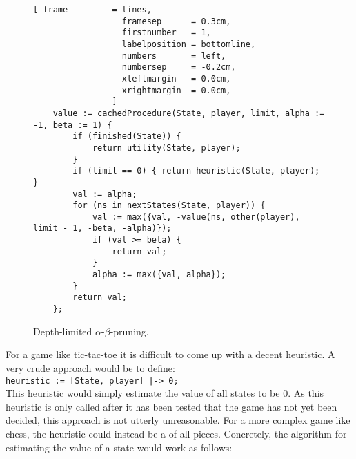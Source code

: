 \begin{figure}[!ht]
\centering
\begin{Verbatim}[ frame         = lines, 
                  framesep      = 0.3cm, 
                  firstnumber   = 1,
                  labelposition = bottomline,
                  numbers       = left,
                  numbersep     = -0.2cm,
                  xleftmargin   = 0.0cm,
                  xrightmargin  = 0.0cm,
                ]
    value := cachedProcedure(State, player, limit, alpha := -1, beta := 1) {
        if (finished(State)) {
            return utility(State, player);
        }
        if (limit == 0) { return heuristic(State, player); }  
        val := alpha;
        for (ns in nextStates(State, player)) {
            val := max({val, -value(ns, other(player), limit - 1, -beta, -alpha)});
            if (val >= beta) {
                return val;
            }
            alpha := max({val, alpha});
        }
        return val;
    };
\end{Verbatim}
\vspace*{-0.3cm}
\caption{Depth-limited $\alpha$-$\beta$-pruning.}
\label{fig:game-limit.stlx}
\end{figure}
For a game like tic-tac-toe it is difficult to come up with a decent heuristic.  A very crude approach would be
to define:
\\[0.2cm]
\hspace*{1.3cm}
\texttt{heuristic := [State, player] |-> 0;}
\\[0.2cm]
This heuristic would simply estimate the value of all states to be $0$.  As this heuristic is only called after
it has been tested that the game has not yet been decided, this approach is not utterly unreasonable.  For a more
complex game like chess, the heuristic could instead be a  of all pieces.  Concretely, the
algorithm for estimating the value of a state would work as follows:
